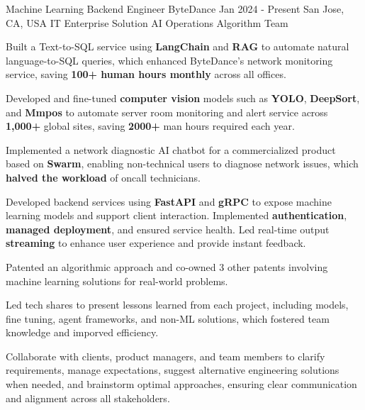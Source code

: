 
\begin{cventries}
  \cventry
    {Machine Learning Backend Engineer} %
    {ByteDance} %
    {Jan 2024 - Present} %
    {San Jose, CA, USA} %
    {IT Enterprise Solution AI Operations Algorithm Team}
    {
      \begin{cvitems} %
        \item {Built a Text-to-SQL service using \textbf{LangChain} and \textbf{RAG} to automate natural language-to-SQL queries, which enhanced ByteDance’s network monitoring service, saving \textbf{100+ human hours monthly} across all offices.}
        \item {Developed and fine-tuned \textbf{computer vision} models such as \textbf{YOLO}, \textbf{DeepSort}, and \textbf{Mmpos} to automate server room monitoring and alert service across \textbf{1,000+} global sites, saving \textbf{2000+} man hours required each year.}
        \item {Implemented a network diagnostic AI chatbot for a commercialized product based on \textbf{Swarm}, enabling non-technical users to diagnose network issues, which \textbf{halved the workload} of oncall technicians.}
        \item {Developed backend services using \textbf{FastAPI} and \textbf{gRPC} to expose machine learning models and support client interaction. Implemented \textbf{authentication}, \textbf{managed deployment}, and ensured service health. Led real-time output \textbf{streaming} to enhance user experience and provide instant feedback.
        }
        \item {Patented an algorithmic approach and co-owned 3 other patents involving machine learning solutions for real-world problems.}
        \item {Led tech shares to present lessons learned from each project, including models, fine tuning, agent frameworks, and non-ML solutions, which fostered team knowledge and imporved efficiency.}
        \item {Collaborate with clients, product managers, and team members to clarify requirements, manage expectations, suggest alternative engineering solutions when needed, and brainstorm optimal approaches, ensuring clear communication and alignment across all stakeholders.}

\end{cvitems}}
\end{cventries}
